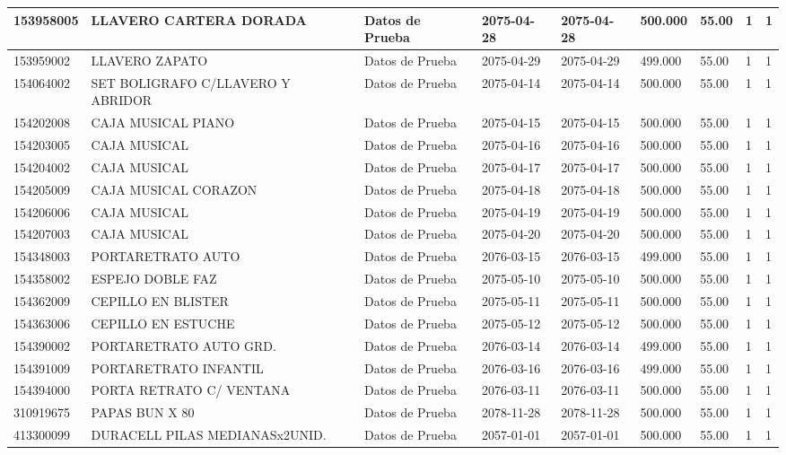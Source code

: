 \documentclass[a4paper,12pt]{article}
\begin{document}
\begin{landscape}
\begin{longtable}{|p{4cm}|p{2.5cm}|p{2.5cm}|p{1.8cm}|p{1.8cm}|p{1cm}|p{1cm}|p{3cm}|p{3cm}||}
153958005 & LLAVERO CARTERA DORADA & Datos de Prueba & 2075-04-28 & 2075-04-28 & 500.000 & 55.00 & 1 & 1 \\ \hline 
153959002 & LLAVERO ZAPATO & Datos de Prueba & 2075-04-29 & 2075-04-29 & 499.000 & 55.00 & 1 & 1 \\ \hline 
154064002 & SET BOLIGRAFO C/LLAVERO Y ABRIDOR & Datos de Prueba & 2075-04-14 & 2075-04-14 & 500.000 & 55.00 & 1 & 1 \\ \hline 
154202008 & CAJA MUSICAL PIANO & Datos de Prueba & 2075-04-15 & 2075-04-15 & 500.000 & 55.00 & 1 & 1 \\ \hline 
154203005 & CAJA MUSICAL & Datos de Prueba & 2075-04-16 & 2075-04-16 & 500.000 & 55.00 & 1 & 1 \\ \hline 
154204002 & CAJA MUSICAL & Datos de Prueba & 2075-04-17 & 2075-04-17 & 500.000 & 55.00 & 1 & 1 \\ \hline 
154205009 & CAJA MUSICAL CORAZON & Datos de Prueba & 2075-04-18 & 2075-04-18 & 500.000 & 55.00 & 1 & 1 \\ \hline 
154206006 & CAJA MUSICAL & Datos de Prueba & 2075-04-19 & 2075-04-19 & 500.000 & 55.00 & 1 & 1 \\ \hline 
154207003 & CAJA MUSICAL & Datos de Prueba & 2075-04-20 & 2075-04-20 & 500.000 & 55.00 & 1 & 1 \\ \hline 
154348003 & PORTARETRATO AUTO & Datos de Prueba & 2076-03-15 & 2076-03-15 & 499.000 & 55.00 & 1 & 1 \\ \hline 
154358002 & ESPEJO DOBLE FAZ & Datos de Prueba & 2075-05-10 & 2075-05-10 & 500.000 & 55.00 & 1 & 1 \\ \hline 
154362009 & CEPILLO EN BLISTER & Datos de Prueba & 2075-05-11 & 2075-05-11 & 500.000 & 55.00 & 1 & 1 \\ \hline 
154363006 & CEPILLO EN ESTUCHE & Datos de Prueba & 2075-05-12 & 2075-05-12 & 500.000 & 55.00 & 1 & 1 \\ \hline 
154390002 & PORTARETRATO AUTO GRD. & Datos de Prueba & 2076-03-14 & 2076-03-14 & 499.000 & 55.00 & 1 & 1 \\ \hline 
154391009 & PORTARETRATO INFANTIL & Datos de Prueba & 2076-03-16 & 2076-03-16 & 499.000 & 55.00 & 1 & 1 \\ \hline 
154394000 & PORTA RETRATO C/ VENTANA & Datos de Prueba & 2076-03-11 & 2076-03-11 & 500.000 & 55.00 & 1 & 1 \\ \hline 
310919675 & PAPAS BUN X 80 & Datos de Prueba & 2078-11-28 & 2078-11-28 & 500.000 & 55.00 & 1 & 1 \\ \hline 
413300099 & DURACELL PILAS MEDIANASx2UNID. & Datos de Prueba & 2057-01-01 & 2057-01-01 & 500.000 & 55.00 & 1 & 1 \\ \hline 

\end{longtable}
\end{landscape}
\end{document}
